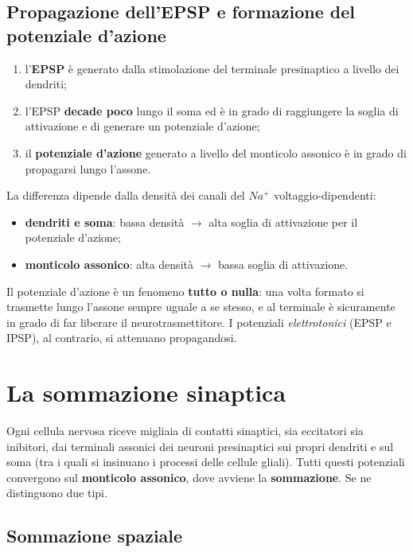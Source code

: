 \subsection{Propagazione dell'EPSP e formazione del potenziale d'azione}

\begin{enumerate}
  \item l'\textbf{EPSP} è generato dalla stimolazione del terminale presinaptico a livello dei
    dendriti;
  \item l'EPSP \textbf{decade poco} lungo il soma ed è in grado di raggiungere la soglia di
    attivazione e di generare un potenziale d'azione;
  \item il \textbf{potenziale d'azione} generato a livello del monticolo assonico è in grado di
    propagarsi lungo l'assone.
\end{enumerate}

La differenza dipende dalla densità dei canali del $Na^+$ voltaggio-dipendenti:
\begin{itemize}
  \item \textbf{dendriti e soma}: bassa densità $\rightarrow$ alta soglia di attivazione per il
    potenziale d'azione;
  \item \textbf{monticolo assonico}: alta densità $\rightarrow$ bassa soglia di attivazione.
\end{itemize}

Il potenziale d'azione è un fenomeno \textbf{tutto o nulla}: una volta formato si trasmette lungo
l'assone sempre uguale a se stesso, e al terminale è sicuramente in grado di far liberare il
neurotrasmettitore. I potenziali \textit{elettrotonici} (EPSP e IPSP), al contrario, si attenuano
propagandosi.

\section{La sommazione sinaptica}

Ogni cellula nervosa riceve migliaia di contatti sinaptici, sia eccitatori sia inibitori, dai
terminali assonici dei neuroni presinaptici sui propri dendriti e sul soma (tra i quali si
insinuano i processi delle cellule gliali). Tutti questi potenziali convergono sul
\textbf{monticolo assonico}, dove avviene la \textbf{sommazione}. Se ne distinguono due tipi.

\subsection{Sommazione spaziale}

